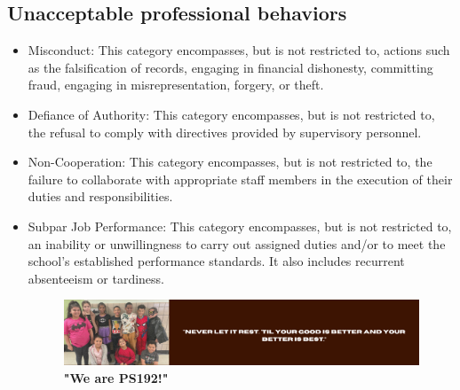 \documentclass[11pt, letterpaper]{article}
\begin{document}
\subsection{Unacceptable professional behaviors} 
\begin{itemize}
\item Misconduct: This category encompasses, but is not restricted to, actions such as the falsification of records, engaging in financial dishonesty, committing fraud, engaging in misrepresentation, forgery, or theft.
\item Defiance of Authority: This category encompasses, but is not restricted to, the refusal to comply with directives provided by supervisory personnel.
\item Non-Cooperation: This category encompasses, but is not restricted to, the failure to collaborate with appropriate staff members in the execution of their duties and responsibilities.
\item Subpar Job Performance: This category encompasses, but is not restricted to, an inability or unwillingness to carry out assigned duties and/or to meet the school's established performance standards. It also includes recurrent absenteeism or tardiness.

\begin{figure}[H]
  \centering
\includegraphics[width=1\linewidth]{3.png}
\caption{\textbf{"We are PS192!"}}
  \label{fig:school motto}
\end{figure}


\end{itemize}
\end{document}
